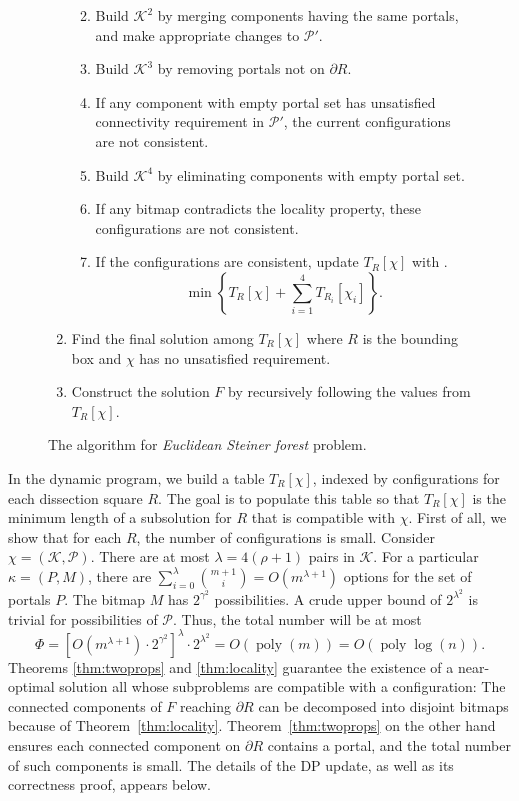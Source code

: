 \documentclass[extras,11pt]{article} \usepackage{fullpage}
\theoremstyle{mytheorem}
\DeclareMathOperator{\poly}{poly}
\newcommand{\prob}[1]{\textit{#1}}
\begin{document}
\begin{figure}
\begin{algorithm}
\begin{enumerate}
\begin{enumerate}
\begin{itemize}
\end{itemize}
 \item Build $\mathcal{K}^2$ by merging components having the same portals,
  and make appropriate changes to $\mathcal{P}'$.
 \item Build $\mathcal{K}^3$ by removing portals not on $\partial R$.
 \item If any component with empty portal set has unsatisfied connectivity requirement in $\mathcal{P}'$, the current configurations are not consistent.
 \item Build $\mathcal{K}^4$ by eliminating components with empty portal set.
 \item If any bitmap contradicts the locality property, these configurations are not consistent.
 \item If the configurations are consistent, update $T_R[\chi]$ with .
\[ \min \left\{ T_R[\chi] + \sum_{i=1}^4 T_{R_i}[\chi_i]\right\}.\]
\end{enumerate}
\item Find the final solution among $T_R[\chi]$ where $R$ is the bounding box and $\chi$ has no unsatisfied requirement.
\item Construct the solution $F$ by recursively following the values from $T_R[\chi]$.
\end{enumerate}
\end{algorithm}
\caption{The algorithm for \prob{Euclidean Steiner forest} problem.\label{fig:for-alg}}
\end{figure}

In the dynamic program, we build a table $T_R[\chi]$, indexed by configurations for each dissection square $R$.
The goal is to populate this table so that $T_R[\chi]$ is the minimum length of a subsolution for $R$ that is compatible with $\chi$.
First of all, we show that for each $R$, the number of configurations is small.
Consider $\chi=(\mathcal{K},\mathcal{P})$.
There are at most $\lambda=4(\rho+1)$ pairs in $\mathcal{K}$.
For a particular $\kappa=(P,M)$, there are
$\sum_{i=0}^{\lambda}{m+1\choose i}=O(m^{\lambda+1})$
 options for the set of portals $P$.
The bitmap $M$ has $2^{\gamma^2}$ possibilities.
A crude upper bound of $2^{\lambda^2}$ is trivial for possibilities of $\mathcal{P}$.
Thus, the total number will be at most
\[  \Phi = \left[ O\left(m^{\lambda+1}\right) \cdot 2^{\gamma^2} \right]^{\lambda} \cdot 2^{\lambda^2} = O(\poly(m))=O(\poly\log(n)). \]
Theorems \ref{thm:twoprops} and \ref{thm:locality} guarantee the existence of a near-optimal solution all whose subproblems are compatible with a  configuration:
The connected components of $F$ reaching $\partial R$ can be decomposed into disjoint bitmaps
because of Theorem~\ref{thm:locality}.
Theorem~\ref{thm:twoprops} on the other hand ensures each connected component on $\partial R$ contains a portal, and the total number of such components is small.
The details of the DP update, as well as its correctness proof, appears 
below.  
\end{document}
